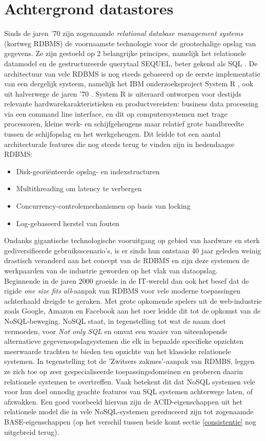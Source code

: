 \chapter{Achtergrond datastores}
\label{cha2}

Sinds de jaren '70 zijn zogenaamde \textit{relational database management systems} (kortweg RDBMS) de voornaamste technologie voor de grootschalige opslag van gegevens. Ze zijn gestoeld op 2 belangrijke principes, namelijk het relationele datamodel \cite{codd1970relational} en de gestructureerde querytaal SEQUEL, beter gekend als SQL \cite{chamberlin1974sequel}. De architectuur van vele RDBMS is nog steeds gebaseerd op de eerste implementatie van een dergelijk systeem, namelijk het IBM onderzoeksproject System R \cite{blasgen1981system}, ook uit halverwege de jaren '70 \cite{Stonebraker:2007:EAE:1325851.1325981}. System R is uiteraard ontworpen voor destijds relevante hardwarekarakteristieken en productvereisten: business data processing via een command line interface, en dit op computersystemen met trage processoren, kleine werk- en schijfgeheugens maar relatief grote bandbreedte tussen de schijfopslag en het werkgeheugen. Dit leidde tot een aantal architecturale features die nog steeds terug te vinden zijn in hedendaagse RDBMS:
\begin{itemize}
\item Disk-geori\"enteerde opslag- en indexstructuren
\item Multithreading om latency te verbergen
\item Concurrency-controlemechanismen op basis van locking
\item Log-gebaseerd herstel van fouten
\end{itemize} 
Ondanks gigantische technologische vooruitgang op gebied van hardware en sterk gediversifieerde gebruiksscenario's, is er sinds hun ontstaan 40 jaar geleden weinig drastisch veranderd aan het concept van de RDBMS en zijn deze systemen de werkpaarden van de industrie geworden op het vlak van dataopslag.\\

Beginnende in de jaren 2000 groeide in de IT-wereld dan ook het besef dat de rigide \textit{one size fits all}-aanpak van RDBMS voor vele moderne toepassingen achterhaald dreigde te geraken. Met grote opkomende spelers uit de web-industrie zoals Google, Amazon en Facebook aan het roer leidde dit tot de opkomst van de NoSQL-beweging. NoSQL staat, in tegenstelling tot wat de naam doet vermoeden, voor \textit{Not only SQL} en omvat een waaier van uiteenlopende alternatieve gegevensopslagsystemen die elk in bepaalde specifieke opzichten meerwaarde trachten te bieden ten opzichte van het klassieke relationele systemen. In tegenstelling tot de 'Zwitsers zakmes'-aanpak van RDMBS, leggen ze zich toe op zeer gespecialiseerde toepassingsdomeinen en proberen daarin relationele systemen te overtreffen. Vaak betekent dit dat NoSQL systemen vele voor hun doel onnodig geachte features van SQL systemen achterwege laten, of afzwakken. Een goed voorbeeld hiervan zijn de ACID-eigenschappen uit het relationele model die in vele NoSQL-systemen gereduceerd zijn tot zogenaamde BASE-eigenschappen (op het verschil tussen beide komt sectie \ref{consistentie} nog uitgebreid terug).

